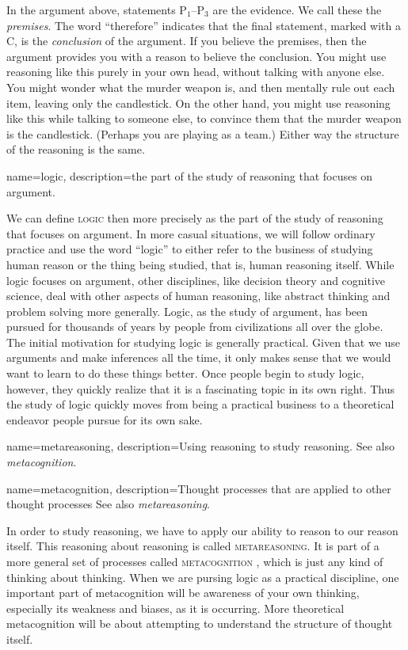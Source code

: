 In the argument above, statements P$_1$--P$_3$ are the evidence. We call these the \emph{premises}. The word ``therefore'' indicates that the final statement, marked with a C, is the \emph{conclusion} of the argument. If you believe the premises, then the argument provides you with a reason to believe the conclusion. You might use reasoning like this purely in your own head, without talking with anyone else. You might wonder what the murder weapon is, and then mentally rule out each item, leaving only the candlestick. On the other hand, you might use reasoning like this while talking to someone else, to convince them that the murder weapon is the candlestick. (Perhaps you are playing as a team.) Either way the structure of the reasoning is the same. 

{
name=logic,
description={the part of the study of reasoning that focuses on argument.}
}

We can define \textsc{\Gls{logic}} \label{def:logic} then more precisely as the part of the study of reasoning that focuses on argument. In more casual situations, we will follow ordinary practice and use the word ``logic'' to either refer to the business of studying human reason or the thing being studied, that is, human reasoning itself. While logic focuses on argument, other disciplines, like decision theory and cognitive science, deal with other aspects of human reasoning, like abstract thinking and problem solving more generally. Logic, as the study of argument, has been pursued for thousands of years by people from civilizations all over the globe. The initial motivation for studying logic is generally practical. Given that we use arguments and make inferences all the time, it only makes sense that we would want to learn to do these things better.  Once people begin to study logic, however, they quickly realize that it is a fascinating topic in its own right. Thus the study of logic quickly moves from being a practical business to a theoretical endeavor people pursue for its own sake. 

{
name=metareasoning,
description={Using reasoning to study reasoning. See also \emph{metacognition}.}
}

{
name=metacognition,
description={Thought processes that are applied to other thought processes See also \emph{metareasoning}.}
}

In order to study reasoning, we have to apply our ability to reason to our reason itself. This reasoning about reasoning is called \textsc{\gls{metareasoning}}. \label{def:Metareasoning} It is part of a more general set of processes called \textsc{\gls{metacognition}} \label{def:Metacognition}, which is just any kind of thinking about thinking. When we are pursing logic as a practical discipline, one important part of metacognition will be awareness of your own thinking, especially its weakness and biases, as it is occurring. More theoretical metacognition will be about attempting to understand the structure of thought itself. 


